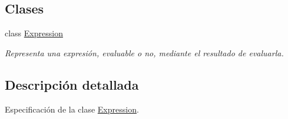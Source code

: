 \subsection*{Clases}
\begin{DoxyCompactItemize}
\item 
class \hyperlink{class_expression}{Expression}
\begin{DoxyCompactList}\small\item\em Representa una expresión, evaluable o no, mediante el resultado de evaluarla. \end{DoxyCompactList}\end{DoxyCompactItemize}


\subsection{Descripción detallada}
Especificación de la clase \hyperlink{class_expression}{Expression}. 


